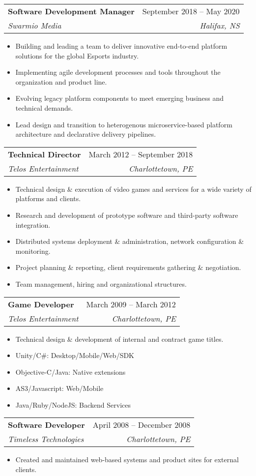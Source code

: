 \documentclass[letterpaper,11pt]{article}
\makeatletter
\newcommand{\resumeItem}[1]{
  \item\small{
    {#1 \vspace{-2pt}}
  }
}
\newcommand{\resumeSubheading}[4]{
  \vspace{-2pt}\item
    \begin{tabular*}{0.97\textwidth}[t]{l@{\extracolsep{\fill}}r}
      \textbf{#1} & #2 \\
      \textit{\small#3} & \textit{\small #4} \\
    \end{tabular*}\vspace{-7pt}
}
\newcommand{\resumeSubSubheading}[2]{
    \item
    \begin{tabular*}{0.97\textwidth}{l@{\extracolsep{\fill}}r}
      \textit{\small#1} & \textit{\small #2} \\
    \end{tabular*}\vspace{-7pt}
}
\newcommand{\resumeItemListStart}{\begin{itemize}}
\newcommand{\resumeItemListEnd}{\end{itemize}\vspace{-5pt}}
\makeatother
\begin{document}
      \resumeSubheading
      {Software Development Manager}{September 2018 -- May 2020}
      {Swarmio Media}{Halifax, NS}
      \resumeItemListStart

        \resumeItem{Building and leading a team to deliver innovative end-to-end platform solutions for the global Esports industry.}
        \resumeItem{Implementing agile development processes and tools throughout the organization and product line.}
        \resumeItem{Evolving legacy platform components to meet emerging business and technical demands.}
        \resumeItem{Lead design and transition to heterogenous microservice-based platform architecture and declarative delivery pipelines.}

      \resumeItemListEnd


      \resumeSubheading
      {Technical Director}{March 2012 -- September 2018}
      {Telos Entertainment}{Charlottetown, PE}
      \resumeItemListStart
        \resumeItem{Technical design \& execution of video games and services for a wide variety of platforms and clients.}
        \resumeItem{Research and development of prototype software and third-party software integration.}
        \resumeItem{Distributed systems deployment \& administration, network configuration \& monitoring.}
        \resumeItem{Project planning \& reporting, client requirements gathering \& negotiation.}
        \resumeItem{Team management, hiring and organizational structures.}

      \resumeItemListEnd

    \resumeSubheading
      {Game Developer}{March 2009 -- March 2012}
      {Telos Entertainment}{Charlottetown, PE}
      \resumeItemListStart
        \resumeItem{Technical design \& development of internal and contract game titles.}
        \resumeItem{Unity/C\#: Desktop/Mobile/Web/SDK}
        \resumeItem{Objective-C/Java: Native extensions}
        \resumeItem{AS3/Javascript: Web/Mobile}
        \resumeItem{Java/Ruby/NodeJS: Backend Services}
      \resumeItemListEnd




    \resumeSubheading
      {Software Developer}{April 2008 -- December 2008}
      {Timeless Technologies}{Charlottetown, PE}
      \resumeItemListStart
        \resumeItem{Created and maintained web-based systems and product sites for external clients.}
      \resumeItemListEnd
\end{document}
